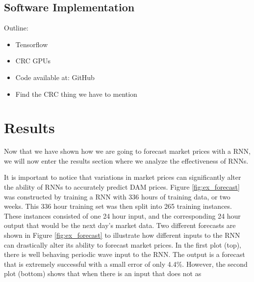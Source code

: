 \documentclass[sigconf]{acmart}
\begin{document}
\subsection{Software Implementation}

Outline:
\begin{itemize}
	\item Tensorflow
	\item CRC GPUs
	\item Code available at: GitHub
	\item Find the CRC thing we have to mention
\end{itemize}


\section{Results}

Now that we have shown how we are going to forecast market prices with a RNN, we will now enter the results section where we analyze the effectiveness of RNNs. 

\label{sec:results}


It is important to notice that variations in market prices can significantly alter the ability of RNNs to accurately predict DAM prices. Figure \ref{fig:ex_forecast} was constructed by training a RNN with 336 hours of training data, or two weeks. This 336 hour training set was then split into 265 training instances. These instances consisted of one 24 hour input, and the corresponding 24 hour output that would be the next day's market data. Two different forecasts are shown in Figure \ref{fig:ex_forecast} to illustrate how different inputs to the RNN can drastically alter its ability to forecast market prices. In the first plot (top), there is well behaving periodic wave input to the RNN. The output is a forecast that is extremely successful with a small error of only 4.4\%. However, the second plot (bottom) shows that when there is an input that does not as 
\end{document}
